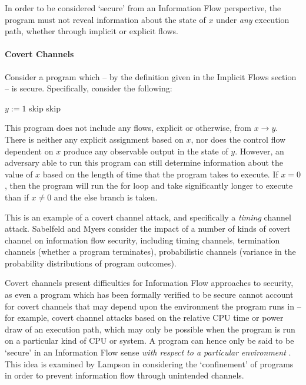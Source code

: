 	In order to be considered `secure' from an Information Flow perspective, the program must not reveal information about the state of $ x $ under \textit{any} execution path, whether through implicit or explicit flows.
	
	\paragraph{Covert Channels}
	
	Consider a program which -- by the definition given in the Implicit Flows section -- is secure. Specifically, consider the following: 
	
	\begin{algorithmic}
		\State $ y := 1 $
				\State skip
			\EndFor
		\Else
			\State skip
		\EndIf
	\end{algorithmic}
	
	This program does not include any flows, explicit or otherwise, from $ x \rightarrow y $. There is neither any explicit assignment based on $ x $, nor does the control flow dependent on $ x $ produce any observable output in the state of $ y $. However, an adversary able to run this program can still determine information about the value of $ x $ based on the length of time that the program takes to execute. If $ x = 0 $, then the program will run the for loop and take significantly longer to execute than if $ x \ne 0 $ and the else branch is taken.
	
	This is an example of a covert channel attack, and specifically a \textit{timing} channel attack. Sabelfeld and Myers \cite{sabelfeld2003if} consider the impact of a number of kinds of covert channel on information flow security, including timing channels, termination channels (whether a program terminates), probabilistic channels (variance in the probability distributions of program outcomes).
	
	Covert channels present difficulties for Information Flow approaches to security, as even a program which has been formally verified to be secure cannot account for covert channels that may depend upon the environment the program runs in -- for example, covert channel attacks based on the relative CPU time or power draw of an execution path, which may only be possible when the program is run on a particular kind of CPU or system. A program can hence only be said to be `secure' in an Information Flow sense \textit{with respect to a particular environment} \cite{sabelfeld2003if}. This idea is examined by Lampson \cite{lampson1973covertchannels} in considering the `confinement' of programs in order to prevent information flow through unintended channels.	
	
